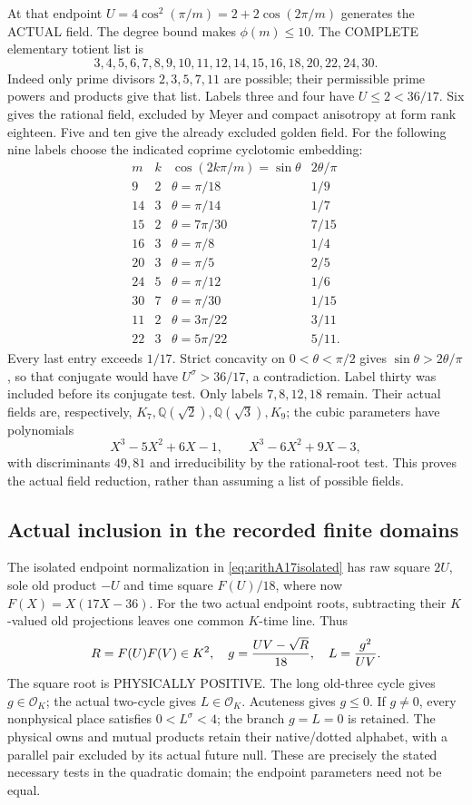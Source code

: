 At that endpoint \(U=4\cos^2(\pi/m)=2+2\cos(2\pi/m)\)
generates the ACTUAL field.
The degree bound makes \(\phi(m)\le10\).
The COMPLETE elementary totient list is
\[
 3,4,5,6,7,8,9,10,11,12,14,15,16,18,20,22,24,30 .
\]
Indeed only prime divisors \(2,3,5,7,11\) are possible;
their permissible prime powers and products give that list.
Labels three and four have \(U\le2<36/17\).
Six gives the rational field, excluded by Meyer and compact
anisotropy at form rank eighteen.
Five and ten give the already excluded golden field.
For the following nine labels choose the indicated coprime
cyclotomic embedding:
\[
\begin{array}{c|c|c|c}
m&k&\cos(2k\pi/m)=\sin\theta&2\theta/\pi\\ \hline
9&2&\theta=\pi/18&1/9\\
14&3&\theta=\pi/14&1/7\\
15&2&\theta=7\pi/30&7/15\\
16&3&\theta=\pi/8&1/4\\
20&3&\theta=\pi/5&2/5\\
24&5&\theta=\pi/12&1/6\\
30&7&\theta=\pi/30&1/15\\
11&2&\theta=3\pi/22&3/11\\
22&3&\theta=5\pi/22&5/11 .
\end{array}
\]
Every last entry exceeds \(1/17\).
Strict concavity on \(0<\theta<\pi/2\) gives
\(\sin\theta>2\theta/\pi\), so that conjugate would have
\(U^\sigma>36/17\), a contradiction.
Label thirty was included before its conjugate test.
Only labels \(7,8,12,18\) remain.
Their actual fields are, respectively,
\(K_7,\mathbb Q(\sqrt2),\mathbb Q(\sqrt3),K_9\);
the cubic parameters have polynomials
\[
 X^3-5X^2+6X-1,\qquad X^3-6X^2+9X-3,
\]
with discriminants \(49,81\) and irreducibility by the
rational-root test.  This proves the actual field reduction,
rather than assuming a list of possible fields.

\subsection{Actual inclusion in the recorded finite domains}
\label{app:arithA17datainclusion}

The isolated endpoint normalization in
\eqref{eq:arithA17isolated} has raw square \(2U\), sole old
product \(-U\) and time square \(F(U)/18\), where now
\(F(X)=X(17X-36)\).
For the two actual endpoint roots, subtracting their \(K\)-valued
old projections leaves one common \(K\)-time line.
Thus
\[
 R=F(U)F(V)\in K^2,\quad
 g={UV-\sqrt R\over18},\quad
 L={g^2\over UV}.
\]
The square root is PHYSICALLY POSITIVE.
The long old-three cycle gives \(g\in\mathcal O_K\);
the actual two-cycle gives \(L\in\mathcal O_K\).
Acuteness gives \(g\le0\).
If \(g\ne0\), every nonphysical place satisfies \(0<L^\sigma<4\);
the branch \(g=L=0\) is retained.
The physical owns and mutual products retain their native/dotted
alphabet, with a parallel pair excluded by its actual future null.
These are precisely the stated necessary tests in the quadratic
domain; the endpoint parameters need not be equal.

